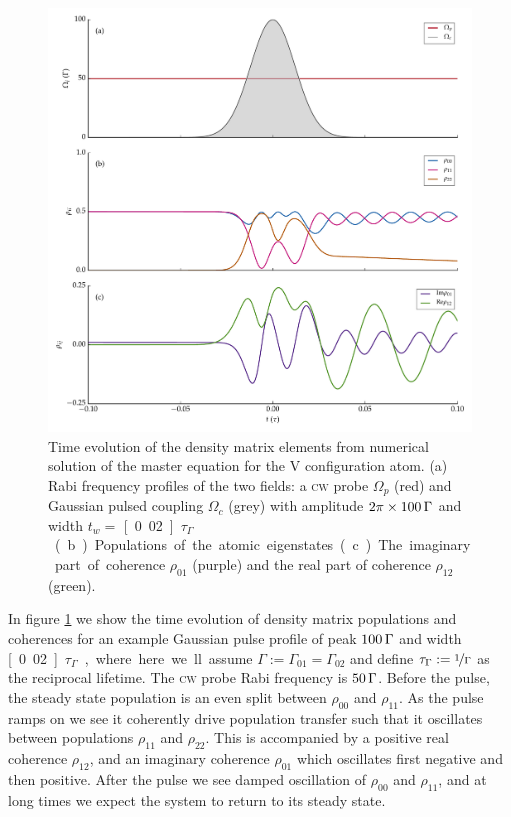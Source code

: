     \begin{figure}
    \includegraphics[width=\linewidth]{figs/06_simultons/ob_vee_solve_pls_t002_50c_100p_fig1.pdf}
    \caption{
    Time evolution of the density matrix elements from numerical solution of the
    master equation for the V configuration atom.  (a) Rabi frequency profiles
    of the two fields: a \textsc{cw} probe $\Omega_p$ (red) and Gaussian pulsed
    coupling $\Omega_c$ (grey) with amplitude $\unit[2\pi\times100]\Gamma$ and width $t_w
    = $ \unit[0.02]{$\tau_\Gamma$}. (b) Populations of the atomic eigenstates.
    (c) The imaginary part of coherence $\rho_{01}$ (purple) and the real part
    of coherence $\rho_{12}$ (green).
    }
    \label{fig:ob_vee_pulse}
    \end{figure}

    In figure \ref{fig:ob_vee_pulse} we show the time evolution of density
    matrix populations and coherences for an example Gaussian pulse profile of
    peak $\unit[100]\Gamma$ and width \unit[0.02]{$\tau_\Gamma$}, where here
    we ll assume $\Gamma := \Gamma_{01} = \Gamma_{02}$ and define $\tau_\Gamma
    := \nicefrac{1}{\Gamma}$ as the reciprocal lifetime. The \textsc{cw} probe
    Rabi frequency is $\unit[50]\Gamma$. Before the pulse, the steady state
    population is an even split between $\rho_{00}$ and $\rho_{11}$. As the
    pulse ramps on we see it coherently drive population transfer such that it
    oscillates between populations $\rho_{11}$ and $\rho_{22}$. This is
    accompanied by a positive real coherence $\rho_{12}$, and an imaginary
    coherence $\rho_{01}$ which oscillates first negative and then positive.
    After the pulse we see damped oscillation of $\rho_{00}$ and $\rho_{11}$,
    and at long times we expect the system to return to its steady state.

